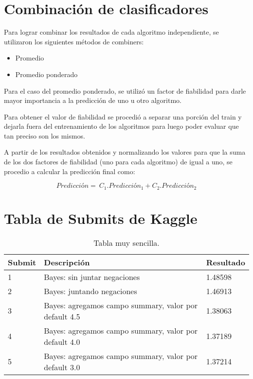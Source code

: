 \documentclass[a4paper,11pt]{report}
\begin{document}
\chapter{Combinación de clasificadores}

Para lograr combinar los resultados de cada algoritmo independiente, se utilizaron los siguientes métodos de combiners:

\begin{itemize}
    \item Promedio
    \item Promedio ponderado
\end{itemize} 

Para el caso del promedio ponderado, se utilizó un factor de fiabilidad para darle mayor importancia a la predicción de uno u otro algoritmo.

Para obtener el valor de fiabilidad se procedió a separar una porción del train y dejarla fuera del entrenamiento de los algoritmos para luego poder evaluar que tan preciso son los mismos. 

A partir de los resultados obtenidos y normalizando los valores para que la suma de los dos factores de fiabilidad (uno para cada algoritmo) de igual a uno, se procedio a calcular la predicción final como:

\[ Predicción = \ C_{1} . Predicción_{1} + C_{2} . Predicción_{2} \]


\chapter{Tabla de Submits de Kaggle}

\begin{table}[htbp]
\begin{center}
\begin{tabular}{|l|l|l|}
\hline
Submit & Descripción & Resultado \\
\hline \hline \hline
1 & Bayes: sin juntar negaciones & 1.48598 \\ \hline
2 & Bayes: juntando negaciones & 1.46913  \\ \hline
3 & Bayes: agregamos campo summary, valor por default 4.5 & 1.38063 \\ \hline
4 & Bayes: agregamos campo summary, valor por default 4.0 & 1.37189 \\ \hline
5 & Bayes: agregamos campo summary, valor por default 3.0 & 1.37214 \\ \hline
\end{tabular}
\caption{Tabla muy sencilla.}
\label{tabla:sencilla}
\end{center}
\end{table}
\end{document}

